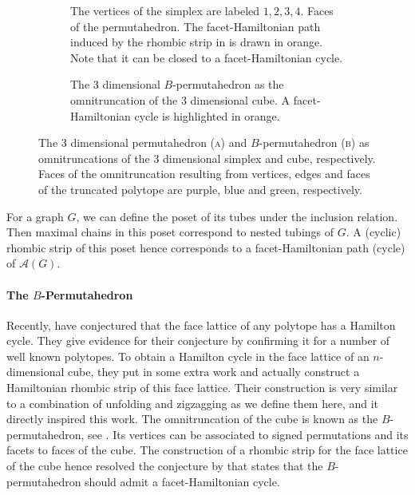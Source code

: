 \documentclass[fontsize=11pt,a4paper,DIV=12]{scrartcl}
\begin{document}
\begin{figure}
    \centering
    \begin{subfigure}[b]{0.48\textwidth}
        \centering
        
        \caption{The vertices of the simplex are labeled $1,2,3,4$. Faces of the permutahedron. The facet-Hamiltonian path induced by the rhombic strip in  is drawn in orange. Note that it can be closed to a facet-Hamiltonian cycle.}
        \label{fig:perm as truncation}
    \end{subfigure}
    \hfill
    \begin{subfigure}[b]{0.48\textwidth}
        \centering
        
        \caption{The 3 dimensional $B$-permutahedron as the omnitruncation of the 3 dimensional cube. A facet-Hamiltonian cycle is highlighted in orange.}
        \label{fig:Bperm}
    \end{subfigure}
    \caption{The 3 dimensional permutahedron (\textsc{a}) and $B$-permutahedron (\textsc{b}) as omnitruncations of the 3 dimensional simplex and cube, respectively. Faces of the omnitruncation resulting from vertices, edges and faces of the truncated polytope are purple, blue and green, respectively.}
    \label{fig:omnitruncation}
\end{figure}
For a graph $G$, we can define the poset of its tubes under the inclusion relation. Then maximal chains in this poset correspond to nested tubings of $G$. A (cyclic) rhombic strip of this poset hence corresponds to a facet-Hamiltonian path (cycle) of $\mathcal A(G)$.

\paragraph{The $B$-Permutahedron}
Recently, \textcite{Listing_faces} have conjectured that the face lattice of any polytope has a Hamilton cycle. They give evidence for their conjecture by confirming it for a number of well known polytopes. To obtain a Hamilton cycle in the face lattice of an $n$-dimensional cube, they put in some extra work and actually construct a Hamiltonian rhombic strip of this face lattice. Their construction is very similar to a combination of unfolding and zigzagging as we define them here, and it directly inspired this work. The omnitruncation of the cube is known as the $B$-permutahedron, see . Its vertices can be associated to signed permutations and its facets to faces of the cube. The construction of a rhombic strip for the face lattice of the cube hence resolved the conjecture by \textcite{facethamiltonicity} that states that the $B$-permutahedron should admit a facet-Hamiltonian cycle.
\end{document}
